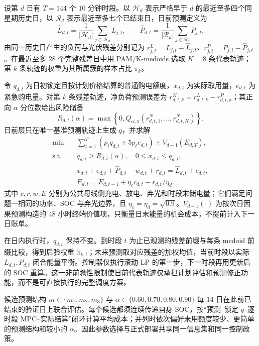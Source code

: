 设第 $d$ 日有 $T=144$ 个 $10$ 分钟时段。以 $\mathcal H_d$ 表示严格早于 $d$ 的最近至多四个同星期历史日，以 $\mathcal R_d$ 表示最近至多七个已结束日，日前预测定义为
\begin{equation}
\widehat L_{d,t}=\frac{1}{|\mathcal H_d|}\sum_{j\in\mathcal H_d}L_{j,t},\qquad
\widehat P_{d,t}=\frac{1}{|\mathcal R_d|}\sum_{j\in\mathcal R_d}P_{j,t}.
\label{eq:q2-forecast}
\end{equation}
由同一历史日产生的负荷与光伏残差分别记为 $r^L_{j,t}=L_{j,t}-\widehat L_{j,t}$、$r^P_{j,t}=P_{j,t}-\widehat P_{j,t}$。在最近至多 $28$ 个完整残差日中用 PAM/K-medoids 选取 $K=8$ 条代表轨迹\cite{pinson}；第 $k$ 条轨迹的权重为其所属簇的样本占比 $\pi_k$。

令 $q_{d,t}$ 为日初锁定且按计划价格结算的普通购电额度，$x_{d,t}$ 为实际取用量，$e_{d,t}$ 为紧急购电量。对第 $k$ 条残差轨迹，净负荷预测误差为 $r^N_{d,t,k}=r^L_{d,t,k}-r^P_{d,t,k}$；其正向 $\alpha$ 分位数给出风险储备
\begin{equation}
R_{d,t}(\alpha)=\max\left\{0,Q_{\alpha,\pi}\left(r^N_{d,t,1},\ldots,r^N_{d,t,K}\right)\right\}.
\label{eq:q2-reserve}
\end{equation}
日前层只在唯一基准预测轨迹上生成 $q$，并求解
\begin{align}
\min\quad &\sum_{t=1}^{T}\left(p_tq_{d,t}+5p_te_{d,t}\right)+V_{d+1}(E_{d,T}),\label{eq:q2-objective}\\
\text{s.t.}\quad &q_{d,t}\ge R_{d,t}(\alpha),\quad 0\le x_{d,t}\le q_{d,t},\nonumber\\
&x_{d,t}+e_{d,t}+\widehat P_{d,t}-w_{d,t}+r_{d,t}=\widehat L_{d,t}+c_{d,t},\label{eq:q2-balance}\\
&E_{d,t}=E_{d,t-1}+\eta_cc_{d,t}-r_{d,t}/\eta_d.\label{eq:q2-soc}
\end{align}
式中 $c,r,w,E$ 分别为公共母线侧充电、放电、弃光和时段末储电量；它们满足问题一相同的功率、SOC 与弃光边界，且 $\eta_c=\eta_d=\sqrt{0.9}$。$V_{d+1}(\cdot)$ 为按次日因果预测构造的 $48$ 小时终端价值项，只衡量日末能量的机会成本，不提前计入下一日账单。

在日内执行时，$q_{d,t}$ 保持不变。到时段 $t$ 为止已观测的残差前缀与每条 medoid 前缀比较，得到后验权重 $\widetilde\pi_{k,t}$；未来预测取对应残差的加权均值，当前时段以实际 $L_{d,t},P_{d,t}$ 闭合能量平衡。控制器仅执行滚动 LP 的第一步，下一时段再用更新后的 SOC 重算。这一非前瞻性限制使日前代表轨迹仅承担计划评估和预测修正功能，而不是可直接执行的完整调度方案。

候选预测结构 $m\in\{m_1,m_2,m_3\}$ 与 $\alpha\in\{0.60,0.70,0.80,0.90\}$ 每 $14$ 日在此前已结束的验证日上联合评估。每个候选都须连续传递自身 SOC，按“预测--锁定 $q$--逐时段 MPC--实际结算”闭环计算平均成本；并列时依次偏好未用额度较少、更简单的预测结构和较小的 $\alpha$。因此参数选择与正式部署共享同一信息集和同一控制政策。

